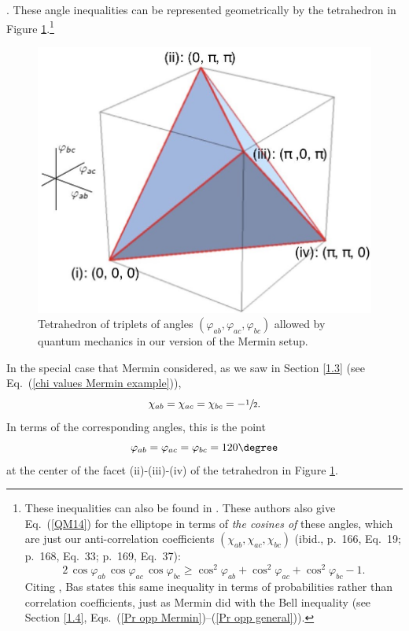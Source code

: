 \citep[p.\ 515; cf.\ the triangle on the right in Figure \ref{vectors4elliptope} in Section \ref{1.6}]{Deza and Laurent 1997}.
These angle inequalities can be represented geometrically by the tetrahedron in Figure \ref{tetrahedron-angles}.\footnote{These inequalities can also be found in \citet[remark on p.\ 170]{Accardi and Fedullo 1982}. These authors also give Eq.\  (\ref{QM14}) for the elliptope in terms of \emph{the cosines of} these angles, which are just our anti-correlation coefficients $(\chi_{ab}, \chi_{ac}, \chi_{bc})$ (ibid., p.\ 166, Eq.\ 19; p.\ 168, Eq.\ 33; p.\ 169, Eq.\ 37):
$$
2 \, \cos{\varphi_{ab}} \, \cos{\varphi_{ac}} \, \cos{\varphi_{bc}} \ge  \cos^2{\!\varphi_{ab}} + \cos^2{\!\varphi_{ac}} + \cos^2{\!\varphi_{bc}} - 1.
$$
Citing \citet{Accardi and Fedullo 1982}, Bas \citet[pp.\ 120--121]{Van Fraassen 1991} states this same inequality in terms of probabilities rather than correlation coefficients, just as Mermin did with the Bell inequality (see Section \ref{1.4}, Eqs.\ (\ref{Pr opp Mermin})--(\ref{Pr opp general})).\label{Accardi Fedullo}}  

\begin{figure}[h]
 \centering
   \includegraphics[width=4.5in]{tetrahedron-angles.jpeg} 
   \caption{Tetrahedron of triplets of angles $(\varphi_{ab}, \varphi_{ac}, \varphi_{bc})$ allowed by quantum mechanics in our version of the Mermin setup.}
   \label{tetrahedron-angles}
\end{figure} 

In the special case that Mermin considered, as we saw in Section \ref{1.3} (see Eq.\ (\ref{chi values Mermin example})),  
\begin{equation}
\chi_{ab} = \chi_{ac} = \chi_{bc} = -\sfrac12.
\label{chi values Mermin example repeat}
\end{equation}
In terms of the corresponding angles, this is the point
\begin{equation}
\varphi_{ab} = \varphi_{ac} = \varphi_{bc} = 120\degree
\end{equation}
at the center of the facet (ii)-(iii)-(iv) of the tetrahedron in Figure \ref{tetrahedron-angles}. 

